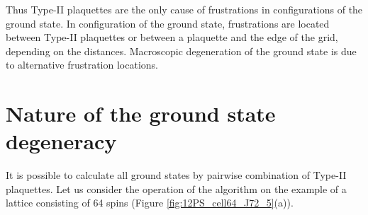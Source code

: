 \documentclass[preprint,12pt]{elsarticle}
\begin{document}
	Thus Type-II plaquettes are the only cause of frustrations in configurations of the ground state. In configuration of the ground state, frustrations are located between Type-II plaquettes or between a plaquette and the edge of the grid, depending on the distances. Macroscopic degeneration of the ground state is due to alternative frustration locations.
	
	\section{Nature of the ground state degeneracy}
	
	It is possible to calculate all ground states by pairwise combination of Type-II plaquettes. Let us consider the operation of the algorithm on the example of a lattice consisting of 64 spins (Figure \ref{fig:12PS_cell64_J72_5}(a)).
	
\end{document}
